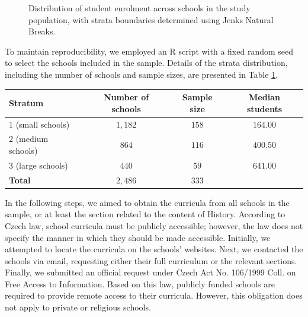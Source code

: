 \documentclass[]{interact}
\theoremstyle{plain}%
\theoremstyle{definition}
\theoremstyle{remark}
\begin{document}
\begin{figure} \centering {} \caption{Distribution of student enrolment across schools in the study population, with strata boundaries determined using Jenks Natural Breaks.} \label{school-distribution-plot} \end{figure}


To maintain reproducibility, we employed an R script with a fixed random seed to select the schools included in the sample. Details of the strata distribution, including the number of schools and sample sizes, are presented in Table \ref{strata-distribution}.

\begin{table}
{\begin{tabular}{lccc} \toprule
Stratum & Number of schools & Sample size & Median students \\ \midrule
1 (small schools) & $1,182$ & $158$ & $164.00$ \\
2 (medium schools) & $864$ & $116$ & $400.50$ \\
3 (large schools) & $440$ & $59$ & $641.00$ \\ \midrule
\textbf{Total} & \textbf{$2,486$} & \textbf{$333$} & \\ \bottomrule
\end{tabular}}
\label{strata-distribution}
\end{table}

In the following steps, we aimed to obtain the curricula from all schools in the sample, or at least the section related to the content of History. According to Czech law, school curricula must be publicly accessible; however, the law does not specify the manner in which they should be made accessible. Initially, we attempted to locate the curricula on the schools’ websites. Next, we contacted the schools via email, requesting either their full curriculum or the relevant sections. Finally, we submitted an official request under Czech Act No. 106/1999 Coll. on Free Access to Information. Based on this law, publicly funded schools are required to provide remote access to their curricula. However, this obligation does not apply to private or religious schools.
\end{document}
